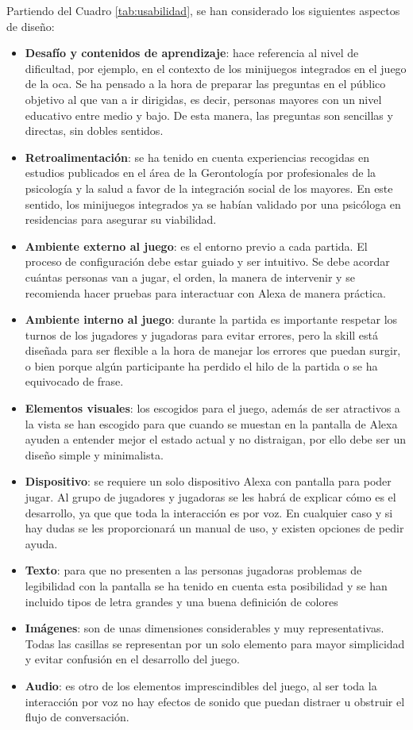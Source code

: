 Partiendo del Cuadro \ref{tab:usabilidad}, se han considerado los siguientes aspectos de diseño:

\begin{itemize}
	\item \textbf{Desafío y contenidos de aprendizaje}: hace referencia al nivel de dificultad, por ejemplo, en el contexto de los minijuegos integrados en el juego de la oca. Se ha pensado a la hora de preparar las preguntas en el público objetivo al que van a ir dirigidas, es decir, personas mayores con un nivel educativo entre medio y bajo. De esta manera, las preguntas son sencillas y directas, sin dobles sentidos.
	\item \textbf{Retroalimentación}: se ha tenido en cuenta experiencias recogidas en estudios publicados en el área de la Gerontología por profesionales de la psicología y la salud a favor de la integración social de los mayores. En este sentido, los minijuegos integrados ya se habían validado por una psicóloga en residencias para asegurar su viabilidad.
	\item \textbf{Ambiente externo al juego}: es el entorno previo a cada partida. El proceso de configuración debe estar guiado y ser intuitivo. Se debe acordar cuántas personas van a jugar, el orden, la manera de intervenir y se recomienda hacer pruebas para interactuar con Alexa de manera práctica.
	\item \textbf{Ambiente interno al juego}: durante la partida es importante respetar los turnos de los jugadores y jugadoras para evitar errores, pero la skill está diseñada para ser flexible a la hora de manejar los errores que puedan surgir, o bien porque algún participante ha perdido el hilo de la partida o se ha equivocado de frase.
	\item \textbf{Elementos visuales}: los escogidos para el juego, además de ser atractivos a la vista se han escogido para que cuando se muestan en la pantalla de Alexa ayuden a entender mejor el estado actual y no distraigan, por ello debe ser un diseño simple y minimalista.
	\item \textbf{Dispositivo}: se requiere un solo dispositivo Alexa con pantalla para poder jugar. Al grupo de jugadores y jugadoras se les habrá de explicar cómo es el desarrollo, ya que que toda la interacción es por voz. En cualquier caso y si hay dudas se les proporcionará un manual de uso, y existen opciones de pedir ayuda.  
	\item \textbf{Texto}: para que no presenten a las personas jugadoras problemas de legibilidad con la pantalla se ha tenido en cuenta esta posibilidad y se han incluido tipos de letra grandes y una buena definición de colores
	\item \textbf{Imágenes}: son de unas dimensiones considerables y muy representativas. Todas las casillas se representan por un solo elemento para mayor simplicidad y evitar confusión en el desarrollo del juego. 
	\item \textbf{Audio}: es otro de los elementos imprescindibles del juego, al ser toda la interacción por voz no hay efectos de sonido que puedan distraer u obstruir el flujo de conversación.
\end{itemize}


